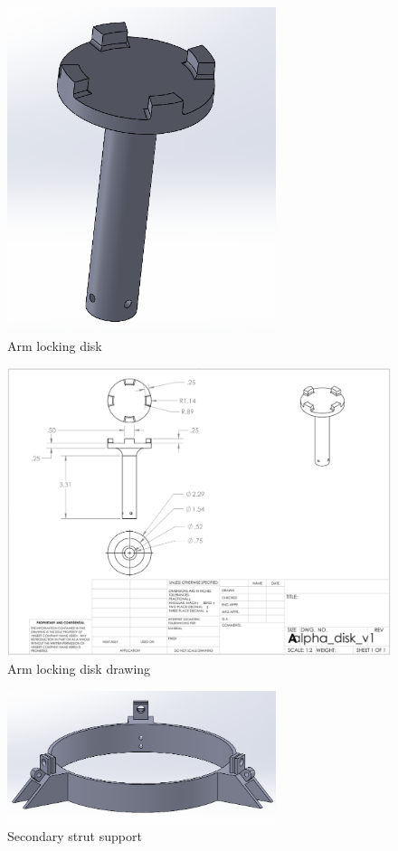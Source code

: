 \begin{figure}[H]
    \centering
    \includegraphics[width=0.7\textwidth]{src/figs/cad-and-dwgs/disk-cad.png}
    \caption{Arm locking disk}
    \label{cad:disk}
\end{figure}


\begin{figure}[H]
    \centering
    \includegraphics[width=\textwidth]{src/figs/cad-and-dwgs/disk_dwg.png}
    \caption{Arm locking disk drawing}
    \label{cad:disk:dwg}
\end{figure}

\begin{figure}[H]
    \centering
    \includegraphics[width=0.7\textwidth]{src/figs/secondary-strut-support-cad.png}
    \caption{Secondary strut support}
    \label{cad:secondary-strut-support}
\end{figure}

